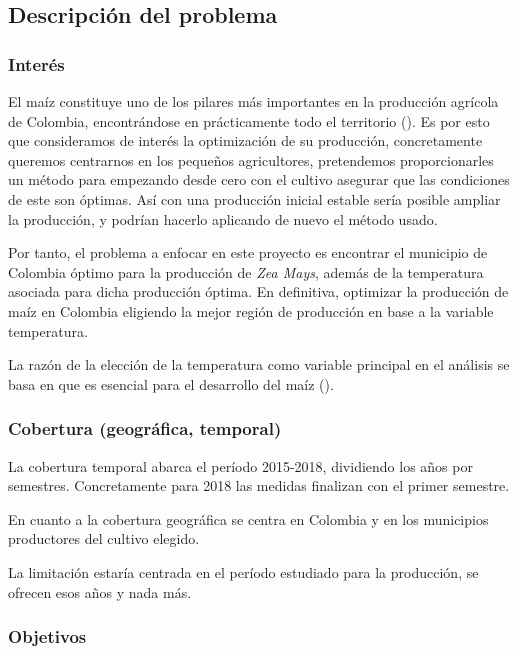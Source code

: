 \documentclass[12pt, spanish]{article}
\begin{document}
\subsection{Descripción del problema}

\subsubsection{Interés}

El maíz constituye uno de los pilares más importantes en la producción agrícola de Colombia, encontrándose en prácticamente todo el territorio (\cite{Lafitte2001}). 
Es por esto que consideramos de interés la optimización de su producción, concretamente queremos centrarnos en los pequeños agricultores, pretendemos proporcionarles un método para empezando desde cero con el cultivo asegurar que las condiciones de este son óptimas. Así con una producción inicial estable sería posible ampliar la producción, y podrían hacerlo aplicando de nuevo el método usado.

Por tanto, el problema a enfocar en este proyecto es encontrar el municipio de Colombia óptimo para la producción de \textit{Zea Mays}, además de la temperatura asociada para dicha producción óptima. En definitiva, optimizar la producción de maíz en Colombia eligiendo la mejor región de producción en base a la variable temperatura.

La razón de la elección de la temperatura como variable principal en el análisis se basa en que es esencial para el desarrollo del maíz (\cite{Lafitte2001}).


\subsubsection{Cobertura (geográfica, temporal)}

La cobertura temporal abarca el período 2015-2018, dividiendo los años por   semestres. Concretamente para 2018 las medidas finalizan con el primer semestre.

En cuanto a la cobertura geográfica se centra en Colombia y en los municipios productores del cultivo elegido.

La limitación estaría centrada en el período estudiado para la producción, se ofrecen esos años y nada más.

\subsubsection{Objetivos}
\end{document}
